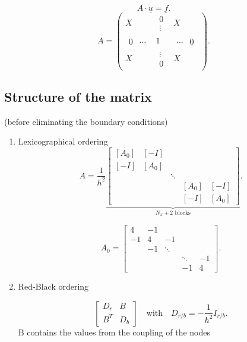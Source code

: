 \[
A\cdot \underline{u} = \underline{f}  
.\] 
\[
A = \begin{pmatrix}
	X & 
	\begin{matrix}
		0 \\
		\vdots
	\end{matrix} & X \\
	\begin{matrix}
		0 & \cdots 
	\end{matrix} & 1 &
	\begin{matrix}
		 \cdots & 0
	\end{matrix}\\
	X & \begin{matrix}
	\vdots \\
	0
	\end{matrix}
	  & X
	
	\end{pmatrix}
.\] 

\subsection{Structure of the matrix}%
\label{sec:Structure of the matrix}
(before eliminating the boundary conditions)
\begin{enumerate}[label=\alph{enumi})]
	\item Lexicographical ordering
		\[
		A= \frac{1}{h^{2}}
		\underbrace{
		\begin{bmatrix}
			[A_{0}] & [-I] &&& \\
			[-I] & [A_0] &&&\\
				 &&\ddots && \\
				 &&& [A_0] & [-I] \\
				 &&& [-I]& [A_0]
		\end{bmatrix}
		}_{N_{x}+2 \text{ blocks}}
		.\] 

		\[
		A_0 = \begin{bmatrix}
			4 & -1 &&& \\
			-1 & 4 & -1 && \\
			 & -1 & \ddots && \\
			 &&&\ddots & -1 \\
			 &&&-1 & 4
		\end{bmatrix}
		.\] 
	\item Red-Black ordering

		\[
			\begin{bmatrix}
				D_{r} & B \\
				B^{T} & D_{b}
			\end{bmatrix}
			\quad \text{with}\quad D_{r/b}=-\frac{1}{h^{2}}I_{r/b}
		.\] 
		B contains the values from the coupling of the nodes
\end{enumerate}

